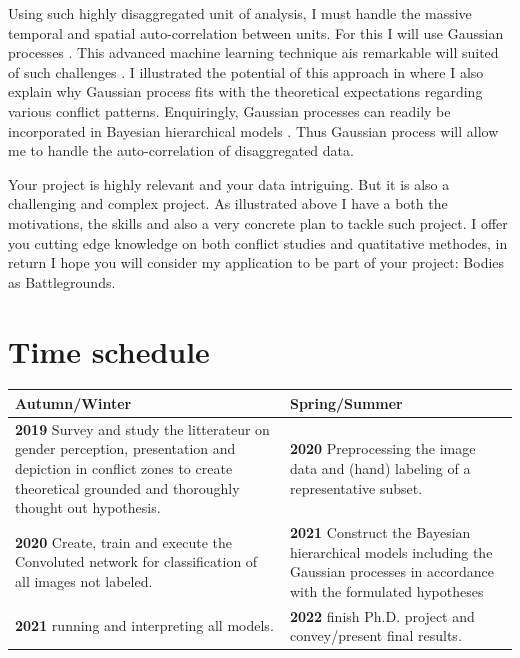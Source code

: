 \documentclass[a4paper]{article}
\begin{document}
Using such highly disaggregated unit of analysis, I must handle the massive temporal and spatial auto-correlation between units. For this I will use Gaussian processes \citep{williams2006gaussian}. This advanced machine learning technique ais remarkable will suited of such challenges \citep{Gelman_2013, gelfand2016spatial, Mcelreath_2018, SPECIALE}. I illustrated the potential of this approach in \cite{SPECIALE} where I also explain why Gaussian process fits with the theoretical expectations regarding various conflict patterns\citep[22-27]{SPECIALE}. Enquiringly, Gaussian processes can readily be incorporated in Bayesian hierarchical models \citep[410-419]{Mcelreath_2018}. Thus Gaussian process will allow me to handle the auto-correlation of disaggregated data.\par


Your project is highly relevant and your data intriguing. But it is also a challenging and complex project. As illustrated above I have a both the motivations, the skills and also a very concrete plan to tackle such project. I offer you cutting edge knowledge on both conflict studies and quatitative methodes, in return I hope you will consider my application to be part of your project: Bodies as Battlegrounds.\par



\pagebreak

\section{Time schedule} 

\begin{center}
\begin{tabular}{ m{7.5cm}| m{7.5cm} } 
    \textbf{Autumn/Winter}              & \textbf{Spring/Summer}\\
	\hline
    \textbf{2019} Survey and study the litterateur on gender perception, presentation and depiction in conflict zones to create theoretical grounded and thoroughly thought out hypothesis.
    & \textbf{2020} Preprocessing the image data and (hand) labeling of a representative subset.\\
    
    \hline
    \textbf{2020} Create, train and execute the Convoluted network for classification of all images not labeled.
    & \textbf{2021} Construct the Bayesian hierarchical models including the Gaussian processes in accordance with the formulated hypotheses\\
    
    \hline
    \textbf{2021} running and interpreting all models.
    & \textbf{2022} finish Ph.D. project and convey/present final results.\\	

\end{tabular}
\end{center}
\pagebreak
\end{document}
